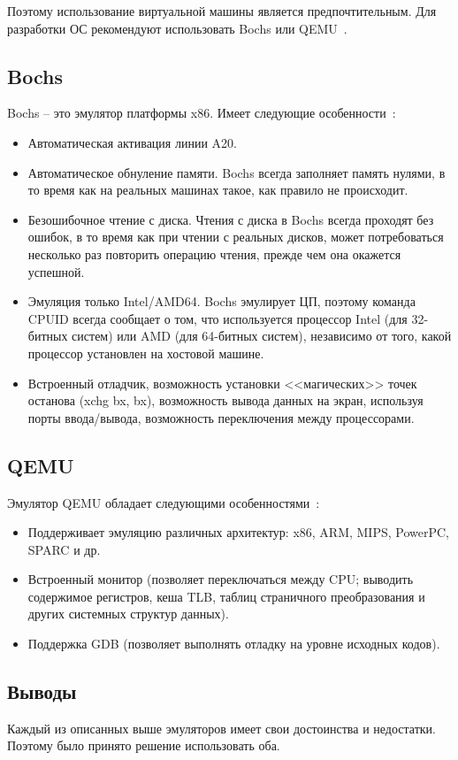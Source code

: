 Поэтому использование виртуальной машины является предпочтительным. Для
разработки ОС рекомендуют использовать Bochs или QEMU~\cite{os_dev}.

\subsection{Bochs}
Bochs -- это эмулятор платформы x86. Имеет следующие особенности~\cite{os_dev}:
\begin{itemize}
\item Автоматическая активация линии A20.
\item Автоматическое обнуление памяти. Bochs всегда заполняет память нулями, в то время как
	на реальных машинах такое, как правило не происходит.
\item Безошибочное чтение с диска. Чтения с диска в Bochs всегда проходят без ошибок, в то
	время как при чтении с реальных дисков, может потребоваться несколько раз повторить
	операцию чтения, прежде чем она окажется успешной.
\item Эмуляция только Intel/AMD64. Bochs эмулирует ЦП, поэтому команда CPUID всегда сообщает
	о том, что используется процессор Intel (для 32-битных систем) или AMD (для 64-битных систем),
	независимо от того, какой процессор установлен на хостовой машине.
\item Встроенный отладчик, возможность установки <<магических>> точек останова (xchg bx, bx),
	возможность вывода данных на экран, используя порты ввода/вывода, возможность переключения
	между процессорами.
\end{itemize}

\subsection{QEMU}
Эмулятор QEMU обладает следующими особенностями~\cite{os_dev}:
\begin{itemize}
\item Поддерживает эмуляцию различных архитектур: x86, ARM, MIPS, PowerPC, SPARC и др.
\item Встроенный монитор (позволяет переключаться между CPU; выводить содержимое регистров, кеша TLB,
	таблиц страничного преобразования и других системных структур данных).
\item Поддержка GDB (позволяет выполнять отладку на уровне исходных кодов).
\end{itemize}

\subsection{Выводы}
Каждый из описанных выше эмуляторов имеет свои достоинства и недостатки. Поэтому
было принято решение использовать оба.




